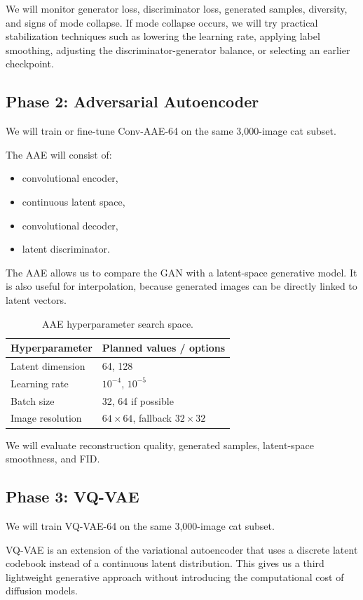 \documentclass[11pt,a4paper]{article}
\begin{document}
We will monitor generator loss, discriminator loss, generated samples, diversity, and signs of mode collapse. If mode collapse occurs, we will try practical stabilization techniques such as lowering the learning rate, applying label smoothing, adjusting the discriminator-generator balance, or selecting an earlier checkpoint.

\subsection{Phase 2: Adversarial Autoencoder}
We will train or fine-tune Conv-AAE-64 on the same 3,000-image cat subset.

The AAE will consist of:
\begin{itemize}
    \item convolutional encoder,
    \item continuous latent space,
    \item convolutional decoder,
    \item latent discriminator.
\end{itemize}

The AAE allows us to compare the GAN with a latent-space generative model. It is also useful for interpolation, because generated images can be directly linked to latent vectors.

\begin{table}[h]
\centering
\caption{AAE hyperparameter search space.}
\begin{tabular}{@{}ll@{}}
\toprule
\textbf{Hyperparameter} & \textbf{Planned values / options} \\ \midrule
Latent dimension & 64, 128 \\
Learning rate & $10^{-4}$, $10^{-5}$ \\
Batch size & 32, 64 if possible \\
Image resolution & $64\times64$, fallback $32\times32$ \\ \bottomrule
\end{tabular}
\end{table}

We will evaluate reconstruction quality, generated samples, latent-space smoothness, and FID.

\subsection{Phase 3: VQ-VAE}
We will train VQ-VAE-64 on the same 3,000-image cat subset.

VQ-VAE is an extension of the variational autoencoder that uses a discrete latent codebook instead of a continuous latent distribution. This gives us a third lightweight generative approach without introducing the computational cost of diffusion models.
\end{document}

